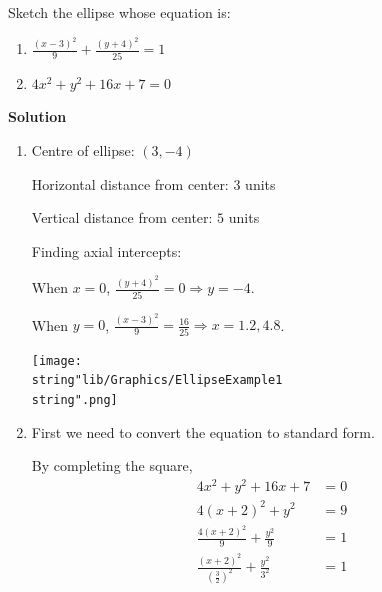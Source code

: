 \documentclass[11pt,a4paper]{book}
\begin{document}
\begin{example}{}
Sketch the ellipse whose equation is:

\begin{enumerate}[label=(\alph*)]

\item  ${\displaystyle \frac{\left(x-3\right)^{2}}{9}+\frac{\left(y+4\right)^{2}}{25}=1}$

\item  $4x^{2}+y^{2}+16x+7=0$

\end{enumerate}

\textbf{Solution}

\begin{enumerate}[label=(\alph*)]

\item \begin{minipage}[t]{0.5\textwidth}

Centre of ellipse: $\left(3,-4\right)$

Horizontal distance from center: $3$ units

Vertical distance from center: $5$ units

Finding axial intercepts:

When $x=0$, ${\displaystyle \frac{\left(y+4\right)^{2}}{25}=0\Rightarrow y=-4}$.

When $y=0$, ${\displaystyle \frac{\left(x-3\right)^{2}}{9}=\frac{16}{25}\Rightarrow x=1.2,4.8}$.

\end{minipage}
\begin{minipage}[t]{0.5\textwidth}

\texttt{[image: \\string"lib/Graphics/EllipseExample1\\string".png]}

\end{minipage}

\item  \begin{minipage}[t]{0.5\textwidth}

First we need to convert the equation to standard form.

By completing the square,
\begin{align*}
4x^{2}+y^{2}+16x+7 & =0\\
4\left(x+2\right)^{2}+y^{2} & =9\\
\frac{4\left(x+2\right)^{2}}{9}+\frac{y^{2}}{9} & =1\\
\frac{\left(x+2\right)^{2}}{\left(\frac{3}{2}\right)^{2}}+\frac{y^{2}}{3^{2}} & =1
\end{align*}


\end{minipage}
\end{enumerate}
\end{example}
\end{document}
